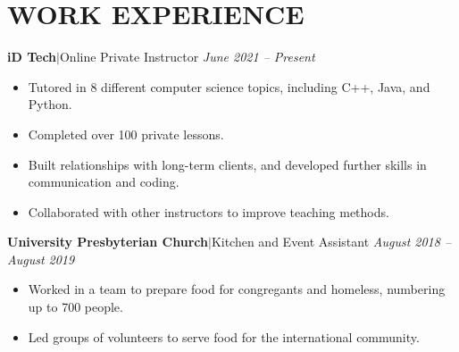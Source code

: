 \documentclass[11pt, a4paper, roman]{moderncv}
\newcommand{\entry}[4]{
	\textbf{#1}\:$|$\:#2 
	\hfill\textit{#3}
	#4
	\vspace{2mm}
}
\begin{document}
\section{WORK EXPERIENCE}

\entry{iD Tech}{Online Private Instructor}{June 2021 -- Present}
{\begin{itemize}
    \item Tutored in 8 different computer science topics, including C++, Java, and Python.
    \item Completed over 100 private lessons.
    \item Built relationships with long-term clients, and developed further skills in communication and coding.
    \item Collaborated with other instructors to improve teaching methods.
  \end{itemize}
}
{\entry{University Presbyterian Church}{Kitchen and Event Assistant}{August 2018 -- August 2019}
	{\begin{itemize}
   		\item Worked in a team to prepare food for congregants and homeless, numbering up to 700 people.
    		\item Led groups of volunteers to serve food for the international community.
  	\end{itemize}}
}
\end{document}
